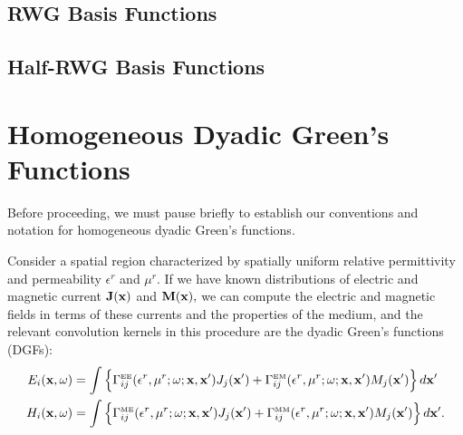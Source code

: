 \documentclass[letterpaper]{article}
\begin{document}
\subsection*{RWG Basis Functions}

\subsection*{Half-RWG Basis Functions}

\newpage
\section{Homogeneous Dyadic Green's Functions}
\label{DyadicGreensFunctionsSection}

Before proceeding, we must pause briefly to establish our 
conventions and notation for homogeneous dyadic Green's
functions.

Consider a spatial region characterized by spatially uniform 
relative permittivity and permeability $\epsilon^r$ and 
$\mu^r$. If we have
known distributions of electric and magnetic current
$\mathbf{J}(\mathbf{x})$ and $\mathbf{M}(\mathbf{x}),$
we can compute the electric and magnetic fields in terms
of these currents and the properties of the medium, and  
the relevant convolution kernels in this procedure are
the dyadic Green's functions (DGFs):
\begin{align*}
 E_i(\mathbf{x}, \omega) 
&= 
   \int
    \Big\{
     \Gamma^{\hbox{\tiny{EE}}}_{ij}(\epsilon^r, \mu^r; \omega; \mathbf{x}, \mathbf{x}^\prime) 
     J_j(\mathbf{x}^\prime)
     +
     \Gamma^{\hbox{\tiny{EM}}}_{ij}(\epsilon^r, \mu^r; \omega; \mathbf{x}, \mathbf{x}^\prime) 
     M_j(\mathbf{x}^\prime)
    \Big\}
    \, d\mathbf{x}^\prime
\\
 H_i(\mathbf{x}, \omega) 
&= 
   \int
    \Big\{
     \Gamma^{\hbox{\tiny{ME}}}_{ij}(\epsilon^r, \mu^r; \omega; \mathbf{x}, \mathbf{x}^\prime) 
     J_j(\mathbf{x}^\prime)
     +
     \Gamma^{\hbox{\tiny{MM}}}_{ij}(\epsilon^r, \mu^r; \omega; \mathbf{x}, \mathbf{x}^\prime) 
     M_j(\mathbf{x}^\prime)
    \Big\}
    \, d\mathbf{x}^\prime.
\end{align*}
\end{document}
